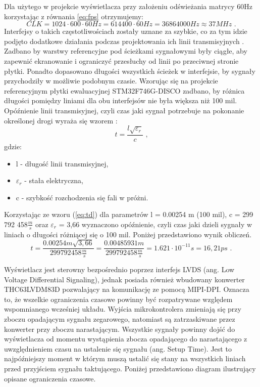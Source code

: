 \documentclass[eng,printmode]{mgr}
\begin{document}
Dla użytego w projekcie wyświetlacza przy założeniu odświeżania matrycy 60Hz korzystając z równania \ref{eq:fps} otrzymujemy:
$$
CLK = 1024 \cdot 600 \cdot 60Hz = 614400 \cdot 60Hz = 36864000 Hz \approx 37MHz \textrm{ .}
$$
Interfejsy o takich częstotliwościach zostały uznane za szybkie, co za tym idzie podjęto dodatkowe działania podczas projektowania ich linii transmisyjnych \cite{usbLayout}. Zadbano by warstwy referencyjne pod ścieżkami sygnałowymi były ciągłe, aby zapewnić ekranowanie i ograniczyć przesłuchy od linii po przeciwnej stronie płytki. Ponadto dopasowano długości wszystkich ścieżek w interfejsie, by sygnały przychodziły w możliwie podobnym czasie. Wzorując się na projekcie referencyjnym płytki ewaluacyjnej STM32F746G-DISCO \cite{disco} zadbano, by różnica długości pomiędzy liniami dla obu interfejsów nie była większa niż 100 mil. Opóźnienie linii transmisyjnej, czyli czas jaki sygnał potrzebuje na pokonanie określonej drogi wyraża się wzorem \cite{highSpeedDesign}:
\begin{equation}
t = \frac{l \sqrt{\varepsilon_r}}{c} \textrm{ ,} \label{eq:td} 
\end{equation}
gdzie:
\begin{itemize}
  \item l - długość linii transmisyjnej,
  \item \textbf{$\varepsilon_r$} - stała elektryczna,
  \item c - szybkość rozchodzenia się fali w próżni.
\end{itemize}
Korzystając ze wzoru (\ref{eq:td}) dla parametrów l = 0.00254 m (100 mil), c = 299 792 458$\frac{m}{s}$ oraz $\varepsilon_r$ = 3,66 wyznaczono opóźnienie, czyli czas jaki dzieli sygnały w liniach o długości różniącej się o 100 mil. Poniżej przedstawiono wynik obliczeń.
$$
t = \frac{0.00254m \sqrt{3,66}}{299 792 458\frac{m}{s}} = \frac{0.00485931m}{299 792 458\frac{m}{s}} = 1.621\cdot10^{-11}s = 16,21 ps \textrm{ .}
$$

Wyświetlacz jest sterowny bezpośrednio poprzez interfejs LVDS (ang. Low Voltage Differential Signaling), jednak  posiada również wbudowany konwerter THC63LVDM83D pozwalający na komunikację ze pomocą MIPI-DPI. Oznacza to, że wszelkie ograniczenia czasowe powinny być rozpatrywane względem wspomnianego wcześniej układu. 
\newpage
Wyjścia
mikrokontrolera zmieniają się przy zboczu opadającym sygnału zegarowego, natomiast są zatrzaskiwane przez konwerter przy zboczu narastającym. Wszystkie sygnały powinny dojść do wyświetlacza od momentu wystąpienia zbocza opadającego do narastającego z uwzględnieniem czasu na ustalenie się sygnału (ang. Setup Time). Jest to najpóźniejszy moment w którym muszą ustalić się stany na wszystkich liniach przed przyjściem sygnału taktującego. Poniżej przedstawiono diagram ilustrujący opisane ograniczenia czasowe.
\end{document}
